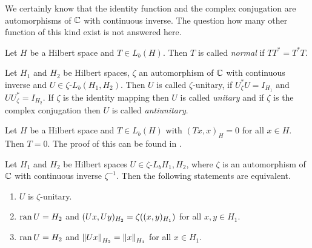 \begin{remark}
	We certainly know that the identity function and the complex conjugation are automorphisms of $\C$ with continuous inverse. The question how many other function of this kind exist is not answered here.
\end{remark}


\begin{definition}
	Let $H$ be a Hilbert space and $T\in L_b(H)$. Then $T$ is called \textit{normal} if $TT^\ast = T^\ast T$. 
\end{definition}


\begin{definition}
	Let $H_1$ and $H_2$ be Hilbert spaces, $\zeta$ an automorphism of $\C$ with continuous inverse and $U \in \zeta$-$L_b(H_1, H_2)$. Then $U$ is called $\zeta$-unitary, if $U_\zeta^\ast U = I_{H_1}$ and $U U_\zeta^\ast = I_{H_2}$. If $\zeta$ is the identity mapping then $U$ is called \textit{unitary} and if $\zeta$ is the complex conjugation then $U$ is called \textit{antiunitary}.
\end{definition}


\begin{remark}\label{remark:operator_equivalence_hilbert}
		Let $H$ be a Hilbert space and $T\in L_b(H)$ with $(Tx,x)_H = 0$ for all $x \in H$. Then $T = 0$. The proof of this can be found in \cite[p.142]{FAna1}.
\end{remark}


\begin{proposition} \label{prop:unitary}
	Let $H_1$ and $H_2$ be Hilbert spaces $U \in \zeta$-$L_b{H_1, H_2}$, where $\zeta$ is an automorphism of $\C$ with continuous inverse $\zeta^{-1}$. Then the following statements are equivalent.
	\begin{enumerate}[label = (\roman*)]
		\item $U$ is $\zeta$-unitary. 
		\item $\ran U = H_2$ and $(Ux , Uy)_{H_2} = \zeta\pbraces{(x,y)_{H_1}}$ for all $x,y \in H_1$.
		\item $\ran U = H_2$ and $\norm[H_2]{Ux} = \norm[H_1]{x}$ for all $x \in H_1$. 
	\end{enumerate}
\end{proposition}

